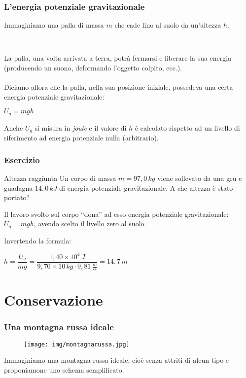 \documentclass[]{beamer}
\theoremstyle{plain}
\begin{document}
\begin{frame}
  \frametitle{L'energia potenziale gravitazionale}
  Immaginiamo una palla di massa $ m $ che cade fino al suolo da un'altezza $ h $.\pause
  
  ~
  
  La palla, una volta arrivata a terra, potrà fermarsi e liberare la sua energia (producendo un suono, deformando l'oggetto colpito, ecc.).\\~\pause\\  
  Diciamo allora che la palla, nella sua posizione iniziale, possedeva una certa \alert{energia potenziale gravitazionale}:
  \begin{center}
\colorbox{marroncino!30}{$ U_g = mgh $}
\end{center}
Anche $ U_g $ si misura in \emph{joule} e il valore di $ h $ è calcolato rispetto ad un livello di riferimento ad energia potenziale nulla (arbitrario).
\end{frame}


\begin{frame}
  \frametitle{Esercizio}
  \begin{exampleblock}{Altezza raggiunta}
{\small Un corpo di massa $ m=97,0 \, kg $ viene sollevato da una gru e guadagna $ 14,0 \, kJ $ di energia potenziale gravitazionale. A che altezza è stato portato?}
\end{exampleblock}
  \pause
  Il lavoro svolto sul corpo ``dona'' ad  esso energia potenziale gravitazionale: $ U_g = mgh $, avendo scelto il livello zero al suolo.\pause
  
  Invertendo la formula:
  \begin{center}
  $ h = \dfrac{U_g}{mg} = \dfrac{1,40 \times 10^4 \, J}{9,70 \times 10 \, kg \cdot 9,81 \, \frac{m}{s^2}} = 14,7 \, m $
  \end{center}
\end{frame}


\section{Conservazione}


\begin{frame}
\frametitle{Una montagna russa ideale}
\begin{figure}
  \texttt{[image: img/montagnarussa.jpg]}
\end{figure}
Immaginiamo una montagna russa ideale, cioè senza attriti di alcun tipo e proponiamone uno schema semplificato.
\end{frame}
\end{document}
